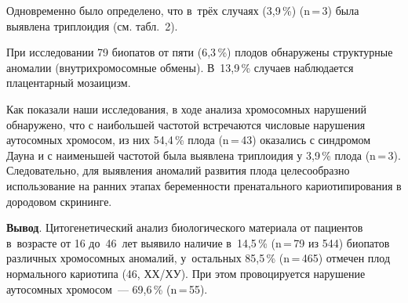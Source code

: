 Одновременно было определено, что в~трёх случаях (3,9\,\%) (n\,=\,3) была выявлена триплоидия (см. табл.~2).



При исследовании 79 биопатов от пяти (6,3\,\%) плодов обнаружены структурные аномалии (внутрихромосомные обмены). В~13,9\,\% случаев наблюдается плацентарный мозаицизм.

Как показали наши исследования, в ходе анализа хромосомных нарушений обнаружено, что с наибольшей частотой встречаются числовые нарушения аутосомных хромосом, из них 54,4\,\% плода (n\,=\,43) оказались с синдромом Дауна и с наименьшей частотой была выявлена триплоидия у 3,9\,\% плода (n\,=\,3). Следовательно, для выявления аномалий развития плода целесообразно использование на ранних этапах беременности пренатального кариотипирования в дородовом скрининге.

\textbf{Вывод}. Цитогенетический анализ биологического материала от пациентов в~возрасте от 16 до~46~лет выявило наличие в~14,5\,\% (n\,=\,79 из 544) биопатов различных хромосомных аномалий, у~остальных 85,5\,\% (n\,=\,465) отмечен плод нормального кариотипа (46, ХХ/ХУ). При этом провоцируется нарушение аутосомных хромосом~--- 69,6\,\% (n\,=\,55).

